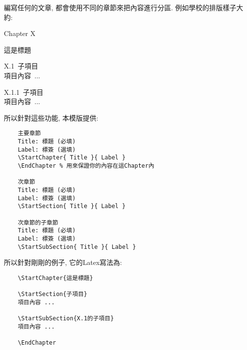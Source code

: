 

編寫任何的文章, 都會使用不同的章節來把內容進行分區. 例如學校的排版樣子大約:

  \EmptyLine
\begin{fmpage}{\textwidth}
  \centerline{\LARGE Chapter X}
  \vspace{0.2cm}
  \centerline{\LARGE 這是標題}

  \vspace{0.5cm}
  \mbox{\Large X.1 子項目}\\
  \mbox{\hspace{1.2cm}項目內容 ...}

  \vspace{0.3cm}
  \mbox{\large X.1.1 子項目}\\
  \mbox{\hspace{1.2cm}項目內容 ...}
\end{fmpage}
  \EmptyLine

所以針對這些功能, 本模版提供:

  \EmptyLine
\begin{fmpage}{\textwidth}
  \begin{verbatim}
    主要章節
    Title: 標題 (必填)
    Label: 標簽 (選填)
    \StartChapter{ Title }{ Label }
    \EndChapter % 用來保證你的內容在這Chapter內

    次章節
    Title: 標題 (必填)
    Label: 標簽 (選填)
    \StartSection{ Title }{ Label }

    次章節的子章節
    Title: 標題 (必填)
    Label: 標簽 (選填)
    \StartSubSection{ Title }{ Label }
  \end{verbatim}
\end{fmpage}
  \EmptyLine

所以針對剛剛的例子, 它的Latex寫法為:

  \EmptyLine
\begin{fmpage}{\textwidth}
  \begin{verbatim}
    \StartChapter{這是標題}

    \StartSection{子項目}
    項目內容 ...

    \StartSubSection{X.1的子項目}
    項目內容 ...

    \EndChapter
  \end{verbatim}
\end{fmpage}

